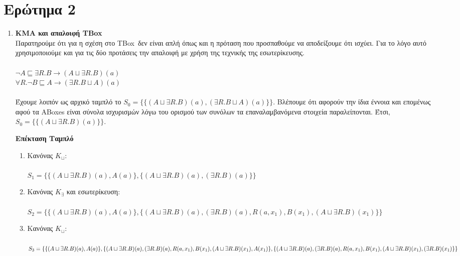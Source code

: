 \documentclass[10pt]{article}
\newcommand{\lat}{\foreignlanguage{english}}
\newcommand{\TBox}{\foreignlanguage{english}{TBox}}
\newcommand{\yp}{\sqsubseteq}
\newcommand{\h}{\sqcup}
\begin{document}
	\section*{Ερώτημα 2}
	\begin{enumerate}
		\item \textbf{ΚΜΑ και απαλοιφή \TBox} \\
		Παρατηρούμε ότι για η σχέση στο \TBox \ δεν είναι απλή όπως και η πρόταση που προσπαθούμε να αποδείξουμε ότι ισχύει. Για το λόγο αυτό χρησιμοποιούμε και για τις δύο προτάσεις την απαλοιφή με χρήση της τεχνικής της εσωτερίκευσης.\\\\
		$\neg A \yp \exists R.B \rightarrow (A \h \exists R.B)(a)$\\
		$\forall R. \neg B \yp A \rightarrow (\exists R.B \h A)(a)$\\\\
		Έχουμε λοιπόν ως αρχικό ταμπλό το $S_0 = \{\{(A \h \exists R.B)(a), (\exists R.B \h A)(a)\}\}$. Βλέπουμε ότι αφορούν την ίδια έννοια και επομένως αφού τα \lat{ABoxes} είναι σύνολα ισχυρισμών λόγω του ορισμού των συνόλων τα επαναλαμβανόμενα στοιχεία παραλείπονται. Έτσι, $S_0 =  \{\{(A \h \exists R.B)(a)\} \}$. 
		
		\textbf{Επέκταση Ταμπλό}
		\begin{enumerate}
			\item Κανόνας $K_{\h}$:\\\\ $S_1 = \{ \{(A \h \exists R.B)(a) , A(a)\} , \{(A \h \exists R.B)(a), (\exists R.B)(a)\} \}$\\
			
			\item Κανόνας $K_{\exists}$ και εσωτερίκευση:\\\\ $S_2 = \{ \{(A \h \exists R.B)(a) , A(a)\} , \{(A \h \exists R.B)(a), (\exists R.B)(a), R(a, x_1), B(x_1), (A \h \exists R.B)(x_1) \} \}$\\
			
			\item Κανόνας $K_{\h}$:\\\\ 
			$S_3 = \{ \{(A \h \exists R.B)(a) , A(a)\} ,\{(A \h \exists R.B)(a), (\exists R.B)(a), R(a, x_1), B(x_1), (A \h \exists R.B)(x_1) , A(x_1) \} ,\\ \{(A \h \exists R.B)(a), (\exists R.B)(a), R(a, x_1), B(x_1), (A \h \exists R.B)(x_1) , (\exists R.B)(x_1) \} \}$\\
			

\end{enumerate}
\end{enumerate}
\end{document}
